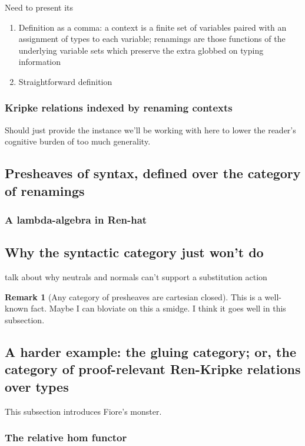 \documentclass[12pt,twoside]{reedthesis}
\theoremstyle{definition}
\newtheorem{remark}{Remark}
\theoremstyle{remark}
\theoremstyle{plain}
\begin{document}
Need to present its
\begin{enumerate}
  \item Definition as a comma: a context is a finite set of variables paired
        with an assignment of types to each variable; renamings are those
        functions of the underlying variable sets which preserve the extra
        globbed on typing information
  \item Straightforward definition
\end{enumerate}

\subsubsection{Kripke relations indexed by renaming contexts}
Should just provide the instance we'll be working with here to lower the
reader's cognitive burden of too much generality.

\subsection{Presheaves of syntax, defined over the category of renamings}

\subsubsection{A lambda-algebra in Ren-hat}

\subsection{Why the syntactic category just won't do}
talk about why neutrals and normals can't support a substitution action
\begin{remark}[Any category of presheaves are cartesian closed]
  This is a well-known fact. Maybe I can bloviate on this a smidge. I think it goes well in this subsection.
\end{remark}

\subsection{A harder example: the gluing category; or, the category of proof-relevant Ren-Kripke relations over types}
This subsection introduces Fiore's monster.
\subsubsection{The relative hom functor}
\end{document}
